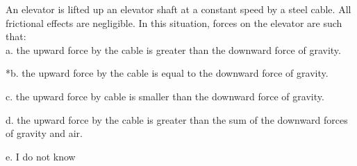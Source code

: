 
An elevator is lifted up an elevator shaft at a constant speed by a steel cable. All frictional effects are negligible. In this situation, forces on the elevator are such that: \\

a. the upward force by the cable is greater than the downward force of gravity.

*b. the upward force by the cable is equal to the downward force of gravity.

c. the upward force by cable is smaller than the downward force of gravity.

d. the upward force by the cable is greater than the sum of the downward forces of gravity and air.

e. I do not know \\ 
